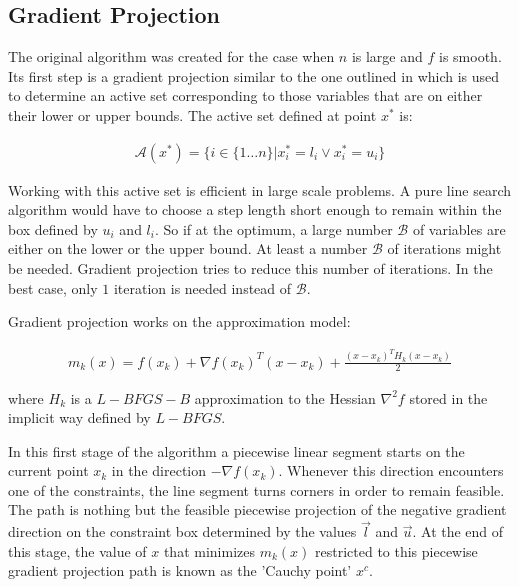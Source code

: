 \subsection{Gradient Projection}
The original algorithm was created for the case when $n$ is large and $f$ is smooth. Its first step is a gradient projection similar to the one outlined in \citep{gradproj1, gradproj2} which is used to determine an active set corresponding to those variables that are on either their lower or upper bounds. The active set defined at point $x^*$ is:

\begin{equation}
  \begin{aligned}
    \mathcal{A}(x^*) = \{ i \in \{1 \ldots n\} |  x^*_i = l_i \vee  x^*_i = u_i\}
  \end{aligned}
\end{equation}

Working with this active set is efficient in large scale problems. A pure line search algorithm would have to choose a step length short enough to remain within the box defined by $u_i$ and $l_i$. So if at the optimum, a large number $\mathcal{B}$ of variables are either on the lower or the upper bound. At least a number $\mathcal{B}$ of iterations might be needed. Gradient projection tries to reduce this number of iterations. In the best case, only $1$ iteration is needed instead of $\mathcal{B}$.

Gradient projection works on the approximation model:

\begin{equation} \label{themodel}
  \begin{aligned}
    m_k(x) = f(x_k) + \nabla f(x_k)^T ( x - x_k) + \frac{(x - x_k)^T H_k (x - x_k) }{2}
  \end{aligned}
\end{equation}

where $H_k$ is a $L-BFGS-B$ approximation to the Hessian $\nabla^2 f$ stored in the implicit way defined by $L-BFGS$.

In this first stage of the algorithm a piecewise linear segment starts on the current point $x_k$ in the direction $-\nabla f(x_k)$. Whenever this direction encounters one of the constraints, the line segment turns corners in order to remain feasible. The path is nothing but the feasible piecewise projection of the negative gradient direction on the constraint box determined by the values $\overrightarrow{l}$ and $\overrightarrow{u}$. At the end of this stage, the value of $x$ that minimizes $m_k(x)$ restricted to this piecewise gradient projection path is known as the 'Cauchy point' $x^c$.

